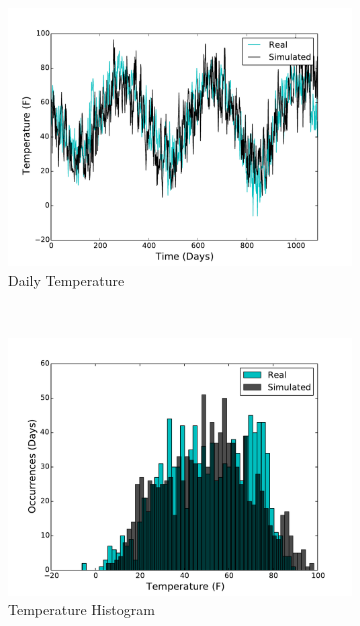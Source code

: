 \documentclass[conference]{IEEEtran}
\begin{document}
\begin{figure}[!t]
  \centering
  \begin{subfigure}[b]{0.4\textwidth}
    \includegraphics[width=\textwidth]{figures/sim_temp.pdf}
    \caption{Daily Temperature}
  \end{subfigure}
  ~
  \begin{subfigure}[b]{0.4\textwidth}
    \includegraphics[width=\textwidth]{figures/sim_temp_hist.pdf}
    \caption{Temperature Histogram}
  \end{subfigure}
  ~
  \begin{subfigure}[b]{0.4\textwidth}

\end{subfigure}
\end{figure}
\end{document}

